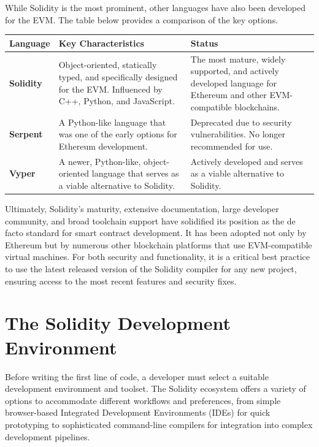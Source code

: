 \documentclass{scrbook}
\begin{document}
While Solidity is the most prominent, other languages have also been developed for the EVM. The table below provides a comparison of the key options.

\begin{table}[h!]
    \centering
    \begin{tabular}{|p{}|p{}|p{}|}
        \hline
        Language & Key Characteristics & Status \\ \hline
        
        \textbf{Solidity} & Object-oriented, statically typed, and specifically designed for the EVM. Influenced by C++, Python, and JavaScript. & The most mature, widely supported, and actively developed language for Ethereum and other EVM-compatible blockchains. \\ \hline
        
        \textbf{Serpent} & A Python-like language that was one of the early options for Ethereum development. & Deprecated due to security vulnerabilities. No longer recommended for use. \\ \hline
        
        \textbf{Vyper} & A newer, Python-like, object-oriented language that serves as a viable alternative to Solidity. & Actively developed and serves as a viable alternative to Solidity. \\ \hline
    \end{tabular}
\end{table}

Ultimately, Solidity's maturity, extensive documentation, large developer community, and broad toolchain support have solidified its position as the de facto standard for smart contract development. It has been adopted not only by Ethereum but by numerous other blockchain platforms that use EVM-compatible virtual machines. For both security and functionality, it is a critical best practice to use the latest released version of the Solidity compiler for any new project, ensuring access to the most recent features and security fixes.

\chapter{The Solidity Development Environment}

Before writing the first line of code, a developer must select a suitable development environment and toolset. The Solidity ecosystem offers a variety of options to accommodate different workflows and preferences, from simple browser-based Integrated Development Environments (IDEs) for quick prototyping to sophisticated command-line compilers for integration into complex development pipelines.\\
\end{document}
